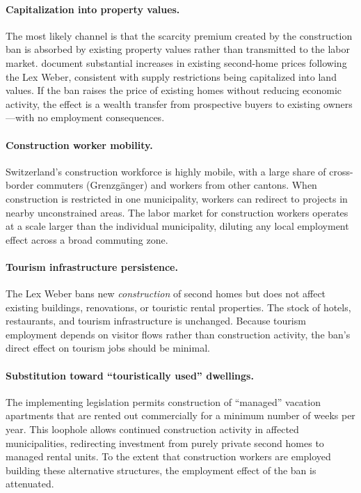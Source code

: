 \documentclass[12pt]{article}
\begin{document}
\paragraph{Capitalization into property values.} The most likely channel is that the scarcity premium created by the construction ban is absorbed by existing property values rather than transmitted to the labor market. \citet{hilber2019} document substantial increases in existing second-home prices following the Lex Weber, consistent with supply restrictions being capitalized into land values. If the ban raises the price of existing homes without reducing economic activity, the effect is a wealth transfer from prospective buyers to existing owners---with no employment consequences.

\paragraph{Construction worker mobility.} Switzerland's construction workforce is highly mobile, with a large share of cross-border commuters (Grenzg\"anger) and workers from other cantons. When construction is restricted in one municipality, workers can redirect to projects in nearby unconstrained areas. The labor market for construction workers operates at a scale larger than the individual municipality, diluting any local employment effect across a broad commuting zone.

\paragraph{Tourism infrastructure persistence.} The Lex Weber bans new \textit{construction} of second homes but does not affect existing buildings, renovations, or touristic rental properties. The stock of hotels, restaurants, and tourism infrastructure is unchanged. Because tourism employment depends on visitor flows rather than construction activity, the ban's direct effect on tourism jobs should be minimal.

\paragraph{Substitution toward ``touristically used'' dwellings.} The implementing legislation permits construction of ``managed'' vacation apartments that are rented out commercially for a minimum number of weeks per year. This loophole allows continued construction activity in affected municipalities, redirecting investment from purely private second homes to managed rental units. To the extent that construction workers are employed building these alternative structures, the employment effect of the ban is attenuated.
\end{document}
